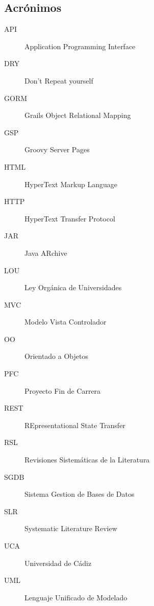 \subsection{Acrónimos}
\begin{description}
	\item [API]	Application Programming Interface
	\item [DRY]	Don't Repeat yourself
	\item [GORM]	Grails Object Relational Mapping
	\item [GSP]	Groovy Server Pages
	\item [HTML]	HyperText Markup Language
	\item [HTTP]	HyperText Transfer Protocol
	\item [JAR]	Java ARchive
	\item [LOU]	Ley Orgánica de Universidades
	\item [MVC]	Modelo Vista Controlador
	\item [OO]	Orientado a Objetos
	\item [PFC]	Proyecto Fin de Carrera	
	\item [REST]	REpresentational State Transfer
	\item [RSL]	Revisiones Sistemáticas de la Literatura
	\item [SGDB]	Sistema Gestion de Bases de Datos
	\item [SLR]	Systematic Literature Review
	\item [UCA]	Universidad de Cádiz
	\item [UML]	Lenguaje Unificado de Modelado
\end{description}

